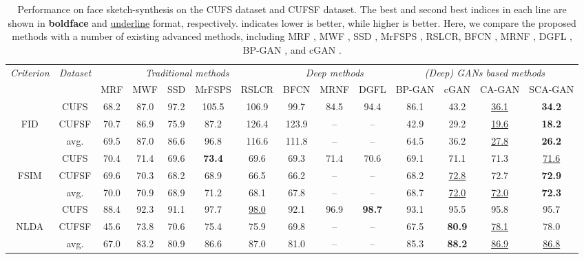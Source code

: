 \documentclass[journal]{IEEEtran}
\begin{document}
\begin{table*}
\centering
\caption{Performance on face sketch-synthesis on the CUFS dataset and CUFSF dataset. The best and second best indices in each line are shown in \textbf{boldface} and \underline{underline} format, respectively.  indicates lower is better, while  higher is better. Here, we compare the proposed methods with a number of existing advanced methods, including MRF \cite{Wang2009Face}, MWF \cite{MWF}, SSD \cite{Song2014Real}, MrFSPS \cite{Peng2016Multiple}, RSLCR\cite{Wang2017RSLCR}, BFCN \cite{BFCN}, MRNF \cite{Zhang2018Markov}, DGFL \cite{Zhu2017Deep}, BP-GAN \cite{wang2017bpgan}, and cGAN \cite{Isola2017Pix2Pix}.}
\label{tab:pfm_sketch}
\begin{tabular}{c|c|ccccc|ccc|cccc}
\toprule		
\textit{Criterion} &	\textit{Dataset} & \multicolumn{5}{c|}{\textit{Traditional methods}}	& \multicolumn{3}{c|}{\textit{Deep methods}}	& \multicolumn{4}{c}{\textit{(Deep) GANs based methods}}	\\
&		&	MRF	&	MWF	&	SSD &	MrFSPS	&	RSLCR	&	BFCN	&	MRNF	&	DGFL  &	BP-GAN	&	cGAN	&	CA-GAN & SCA-GAN	\\
\midrule
	& CUFS     &	68.2 	&	87.0 	&	97.2 &	105.5 	&	106.9 	&	99.7	&	84.5 	&	94.4 &	86.1&	43.2 &	\underline{36.1} &	\textbf{34.2}\\
FID	& CUFSF    & 70.7	&	86.9	&	75.9	&	87.2 &	126.4	&	123.9	&	--	&	--	&	42.9	&	29.2	&	\underline{19.6}	&	\textbf{18.2}\\
& avg. &  69.5 & 87.0 & 86.6 &  96.8  & 116.6 & 111.8 & -- & -- & 64.5 & 36.2 & \underline{27.8} & \textbf{26.2}  \\

\midrule
	&	CUFS	&	70.4	&	71.4	&	69.6	&	\textbf{73.4} 		&	69.6 	&	69.3 	&	71.4 	&	70.6 &	69.1 	&	71.1 	&	71.3 	&	\underline{71.6} 	\\
FSIM&	CUFSF	&	69.6	&	70.3	&	68.2	& 68.9	&	66.5 	&	66.2 	&--	&--	&	68.2 &	\underline{72.8} 	&	 72.7	&	\textbf{72.9} 	\\
& avg. &  70.0 & 70.9 & 68.9 & 71.2 & 68.1 & 67.8 & -- & -- & 68.7 & \underline{72.0} & \underline{72.0} & \textbf{72.3}  \\

\midrule
	& CUFS &	88.4 	&	92.3 	&	91.1 &	97.7 &	\underline{98.0} 	&	92.1	&	96.9 	&	\textbf{98.7} &	93.1 	&	95.5 	&	95.8 	&	95.7 \\
NLDA&	CUFSF	&	45.6	&	73.8	&	70.6&	75.4 	&	75.9 	&	69.8 	&--	&--	&	67.5 	&	\textbf{80.9} 	&	\underline{78.1} 	&	78.0 	\\
& avg. & 67.0 & 83.2 & 80.9 & 86.6 & 87.0 & 81.0 & -- & -- & 85.3 & \textbf{88.2} & \underline{86.9} & \underline{86.8} \\
\bottomrule	
\end{tabular}
\vspace{-0.4cm}
\end{table*}
\end{document}
